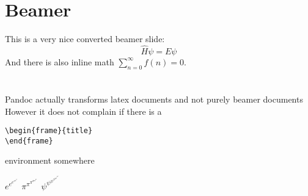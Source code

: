 \section{Beamer}
This is a very nice converted beamer slide:
%
\begin{equation*}
  \hat{H} \psi = E \psi
\end{equation*}
%
And there is also inline math $ \sum_{n=0} ^{\infty} f(n) = 0 $.

\section{}
Pandoc actually transforms latex documents and not purely beamer documents \\

However it does not complain if there is a

\begin{verbatim}
\begin{frame}{title}
\end{frame}
\end{verbatim}

environment somewhere

$ e ^{e ^{e ^{e ^{e ^{e ^{e}}}}}} $
$ \pi ^{\pi ^{\pi ^{\pi ^{\pi ^{\pi ^{\pi}}}}}} $
$ \psi ^{\psi ^{\psi ^{\psi ^{\psi ^{\psi ^{\psi}}}}}} $

